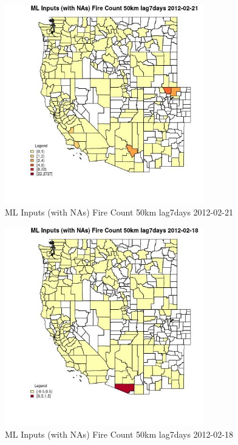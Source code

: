 \begin{figure} 
\centering  
\includegraphics[width=0.77\textwidth]{Code_Outputs/Report_ML_input_PM25_Step4_part_f_de_duplicated_aveswNAs_CountyFire_Count_50km_lag7daysMean2012-02-21.jpg} 
\caption{\label{fig:Report_ML_input_PM25_Step4_part_f_de_duplicated_aveswNAsCountyFire_Count_50km_lag7daysMean2012-02-21}ML Inputs (with NAs) Fire Count 50km lag7days 2012-02-21} 
\end{figure} 
 

\begin{figure} 
\centering  
\includegraphics[width=0.77\textwidth]{Code_Outputs/Report_ML_input_PM25_Step4_part_f_de_duplicated_aveswNAs_CountyFire_Count_50km_lag7daysMean2012-02-18.jpg} 
\caption{\label{fig:Report_ML_input_PM25_Step4_part_f_de_duplicated_aveswNAsCountyFire_Count_50km_lag7daysMean2012-02-18}ML Inputs (with NAs) Fire Count 50km lag7days 2012-02-18} 
\end{figure} 
 


